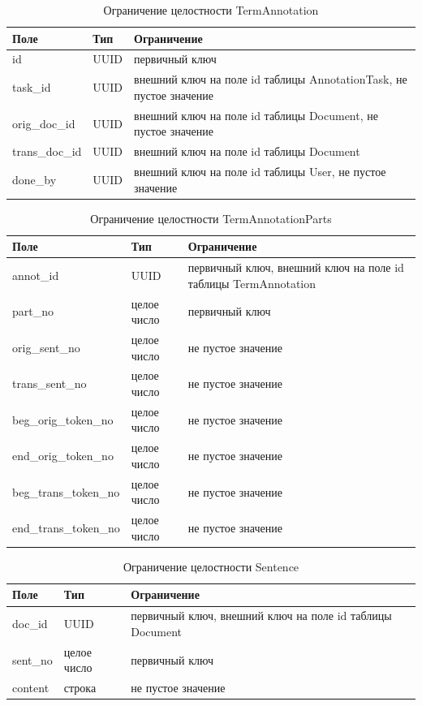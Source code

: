 \begin{table}[H]
\centering
\caption{Ограничение целостности TermAnnotation}
\begin{tabular}{|m{3cm}|m{3cm}|m{6cm}|}
\hline
\textbf{Поле} & \textbf{Тип} & \textbf{Ограничение} \\ \hline
id & UUID & первичный ключ \\ \hline
task\_id & UUID & внешний ключ на поле id таблицы AnnotationTask, не пустое значение \\ \hline
orig\_doc\_id & UUID & внешний ключ на поле id таблицы Document, не пустое значение \\ \hline
trans\_doc\_id & UUID & внешний ключ на поле id таблицы Document \\ \hline
done\_by & UUID & внешний ключ на поле id таблицы User, не пустое значение \\ \hline
\end{tabular}
\end{table}

\begin{table}[H]
\centering
\caption{Ограничение целостности TermAnnotationParts}
\begin{tabular}{|m{5cm}|m{3cm}|m{6cm}|}
\hline
\textbf{Поле} & \textbf{Тип} & \textbf{Ограничение} \\ \hline
annot\_id & UUID & первичный ключ, внешний ключ на поле id таблицы TermAnnotation \\ \hline
part\_no & целое число & первичный ключ \\ \hline
orig\_sent\_no & целое число & не пустое значение \\ \hline
trans\_sent\_no & целое число & не пустое значение \\ \hline
beg\_orig\_token\_no & целое число & не пустое значение \\ \hline
end\_orig\_token\_no & целое число & не пустое значение \\ \hline
beg\_trans\_token\_no & целое число & не пустое значение \\ \hline
end\_trans\_token\_no & целое число & не пустое значение \\ \hline
\end{tabular}
\end{table}

\begin{table}[H]
\centering
\caption{Ограничение целостности Sentence}
\begin{tabular}{|m{3cm}|m{3cm}|m{6cm}|}
\hline
\textbf{Поле} & \textbf{Тип} & \textbf{Ограничение} \\ \hline
doc\_id & UUID & первичный ключ, внешний ключ на поле id таблицы Document \\ \hline
sent\_no & целое число & первичный ключ \\ \hline
content & строка & не пустое значение \\ \hline
\end{tabular}
\end{table}

